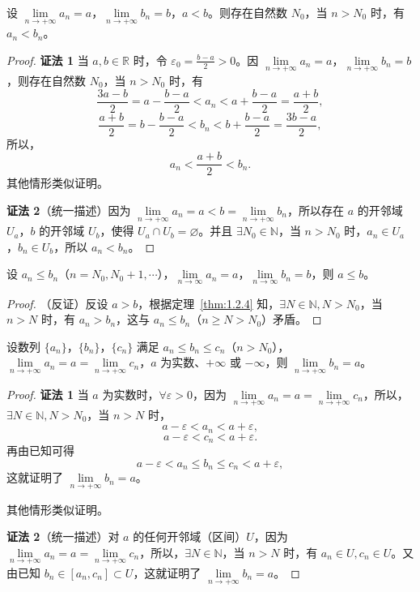 \begin{theorem}\label{thm:1.2.4}
设 $\lim\limits_{n\to+\infty}a_n=a$，$\lim\limits_{n\to+\infty}b_n=b$，$a<b$。则存在自然数 $N_0$，当 $n>N_0$ 时，有 $a_n<b_n$。
\end{theorem}

\begin{proof}
\textbf{证法 1} 当 $a, b \in \mathbb{R}$ 时，令 $\varepsilon_{0} = \frac{b - a}{2} > 0$。因 $\lim\limits_{n \to +\infty} a_{n} = a$，$\lim\limits_{n \to +\infty} b_{n} = b$，则存在自然数 $N_{0}$，当 $n > N_{0}$ 时，有
\[
\frac{3a-b}{2} = a - \frac{b-a}{2} < a_{n} < a + \frac{b-a}{2} = \frac{a+b}{2},
\]
\[
\frac{a+b}{2} = b - \frac{b-a}{2} < b_{n} < b + \frac{b-a}{2} = \frac{3b-a}{2},
\]
所以，
\[
a_{n} < \frac{a+b}{2} < b_{n}.
\]
其他情形类似证明。

\textbf{证法 2}（统一描述）因为 $\lim\limits_{n\to+\infty}a_n=a < b = \lim\limits_{n\to+\infty}b_n$，所以存在 $a$ 的开邻域 $U_a$，$b$ 的开邻域 $U_b$，使得 $U_a \cap U_b = \varnothing$。并且 $\exists N_0 \in \mathbb{N}$，当 $n > N_0$ 时，$a_n \in U_a$，$b_n \in U_b$，所以 $a_n < b_n$。
\end{proof}

\begin{theorem}\label{thm:1.2.5}
设 $a_{n} \leqslant b_{n}$（$n = N_{0}, N_{0} + 1, \cdots$），$\lim\limits_{n \to \infty} a_{n} = a$，$\lim\limits_{n \to \infty} b_{n} = b$，则 $a \leqslant b$。
\end{theorem}

\begin{proof}
（反证）反设 $a > b$，根据定理~\ref{thm:1.2.4} 知，$\exists N \in \mathbb{N}, N > N_0$，当 $n > N$ 时，有 $a_n > b_n$，这与 $a_n \leqslant b_n$（$n \geqslant N > N_0$）矛盾。
\end{proof}

\begin{theorem}[夹逼定理]\label{thm:1.2.6}
设数列 $\{a_{n}\}$，$\{b_{n}\}$，$\{c_{n}\}$ 满足 $a_{n} \leqslant b_{n} \leqslant c_{n}$（$n > N_{0}$），$\lim\limits_{n \to +\infty} a_{n} = a = \lim\limits_{n \to +\infty} c_{n}$，$a$ 为实数、$+\infty$ 或 $-\infty$，则 $\lim\limits_{n \to +\infty} b_{n} = a$。
\end{theorem}

\begin{proof}
\textbf{证法 1} 当 $a$ 为实数时，$\forall \varepsilon > 0$，因为 $\lim\limits_{n \to +\infty} a_n = a = \lim\limits_{n \to +\infty} c_n$，所以，$\exists N \in \mathbb{N}, N > N_0$，当 $n > N$ 时，
\[
a-\varepsilon < a_{n} < a+\varepsilon,
\]
\[
a-\varepsilon < c_{n} < a+\varepsilon.
\]
再由已知可得
\[
a-\varepsilon < a_{n} \leqslant b_{n} \leqslant c_{n} < a+\varepsilon,
\]
这就证明了 $\lim\limits_{n\to+\infty}b_{n}=a$。

其他情形类似证明。

\textbf{证法 2}（统一描述）对 $a$ 的任何开邻域（区间）$U$，因为 $\lim\limits_{n\to+\infty}a_n = a = \lim\limits_{n\to+\infty}c_n$，所以，$\exists N\in\mathbb{N}$，当 $n>N$ 时，有 $a_n\in U, c_n\in U$。又由已知 $b_n\in[a_n,c_n]\subset U$，这就证明了 $\lim\limits_{n\to+\infty}b_n=a$。
\end{proof}

